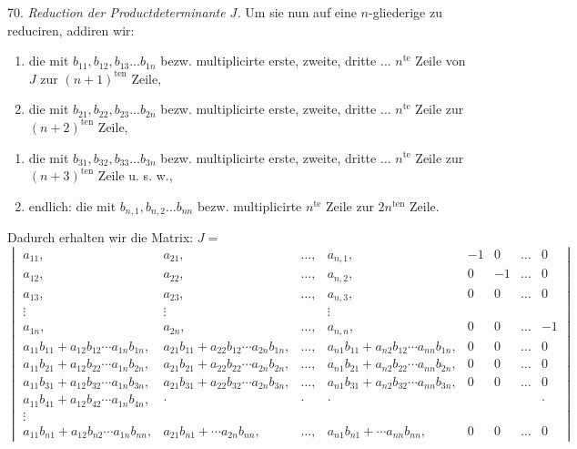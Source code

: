 \documentclass[11pt]{article}
\providecommand{\weberpage}[1]{}
\begin{document}
70. \textit{Reduction der Productdeterminante $J$.} Um sie nun auf eine
$n$-gliederige zu reduciren, addiren wir:
\begin{enumerate}
\item[1)] die mit $b_{11}, b_{12}, b_{13} \dots b_{1n}$ bezw.
multiplicirte erste, zweite, dritte $\dots$ $n^{\text{te}}$ Zeile von
$J$ zur $(n+1)^{\text{ten}}$ Zeile,
\item[2)] die mit $b_{21}, b_{22}, b_{23} \dots b_{2n}$ bezw.
multiplicirte erste, zweite, dritte $\dots$ $n^{\text{te}}$ Zeile zur
$(n+2)^{\text{ten}}$ Zeile,
\end{enumerate}


\weberpage{75}
\begin{enumerate}
\item[3)] die mit $b_{31}, b_{32}, b_{33} \dots b_{3n}$ bezw.
multiplicirte erste, zweite, dritte $\dots$ $n^{\text{te}}$ Zeile zur
$(n+3)^{\text{ten}}$ Zeile u. s. w.,
\item[] endlich: die mit $b_{n,1}, b_{n,2} \dots b_{nn}$ bezw.
multiplicirte $n^{\text{te}}$ Zeile zur $2n^{\text{ten}}$ Zeile.
\end{enumerate}
Dadurch erhalten wir die Matrix: $J=$
\[
\begin{vmatrix}
a_{11}, & a_{21}, & \dots, & a_{n,1}, & -1 & 0 & \dots & 0 \\
a_{12}, & a_{22}, & \dots, & a_{n,2}, & 0 & -1 & \dots & 0 \\
a_{13}, & a_{23}, & \dots, & a_{n,3}, & 0 & 0 & \dots & 0 \\
\vdots & \vdots & & \vdots & & & & \\
a_{1n}, & a_{2n}, & \dots, & a_{n,n}, & 0 & 0 & \dots & -1 \\
a_{11}b_{11}+a_{12}b_{12}\cdots a_{1n}b_{1n}, & a_{21}b_{11}+a_{22}b_{12}\cdots a_{2n}b_{1n}, & \dots, & a_{n1}b_{11}+a_{n2}b_{12}\cdots a_{nn}b_{1n}, & 0 & 0 & \dots & 0 \\
a_{11}b_{21}+a_{12}b_{22}\cdots a_{1n}b_{2n}, & a_{21}b_{21}+a_{22}b_{22}\cdots a_{2n}b_{2n}, & \dots, & a_{n1}b_{21}+a_{n2}b_{22}\cdots a_{nn}b_{2n}, & 0 & 0 & \dots & 0 \\
a_{11}b_{31}+a_{12}b_{32}\cdots a_{1n}b_{3n}, & a_{21}b_{31}+a_{22}b_{32}\cdots a_{2n}b_{3n}, & \dots, & a_{n1}b_{31}+a_{n2}b_{32}\cdots a_{nn}b_{3n}, & 0 & 0 & \dots & 0 \\
a_{11}b_{41}+a_{12}b_{42}\cdots a_{1n}b_{4n}, & \cdot & \cdot & \cdot & & & & \cdot \\
\vdots & & & & & & & \\
a_{11}b_{n1}+a_{12}b_{n2}\cdots a_{1n}b_{nn}, & a_{21}b_{n1}+\cdots a_{2n}b_{nn}, & \dots, & a_{n1}b_{n1}+\cdots a_{nn}b_{nn}, & 0 & 0 & \dots & 0
\end{vmatrix}
\] %
\end{document}
